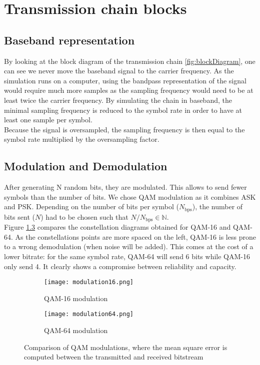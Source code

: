 \setcounter{secnumdepth}{-1}

\chapter{Transmission chain blocks}

\section{Baseband representation}

By looking at the block diagram of the transmission chain \ref{fig:blockDiagram}, one can see we never move the baseband signal to the carrier frequency. As the simulation runs on a computer, using the bandpass representation of the signal would require much more samples as the sampling frequency would need to be at least twice the carrier frequency. By simulating the chain in baseband, the minimal sampling frequency is reduced to the symbol rate in order to have at least one sample per symbol. \\
Because the signal is oversampled, the sampling frequency is then equal to the symbol rate multiplied by the oversampling factor. \\

\section{Modulation and Demodulation}

After generating N random bits, they are modulated. This allows to send fewer symbols than the number of bits. We chose QAM modulation as it combines ASK and PSK. Depending on the number of bits per symbol ($N_{\text{bps}}$), the number of bits sent ($N$) had to be chosen such that  $N / N_{\text{bps}} \in \mathbb{N}$. \\
Figure \ref{fig:QAMComparison} compares the constellation diagrams obtained for QAM-16 and QAM-64. As the constellations points are more spaced on the left, QAM-16 is less prone to a wrong demodulation (when noise will be added). This comes at the cost of a lower bitrate: for the same symbol rate, QAM-64 will send 6 bits while QAM-16 only send 4. It clearly shows a compromise between reliability and capacity. \\

\begin{figure}[H]
    \centering
    \begin{subfigure}[b]{0.45\linewidth}
        \centering
        \texttt{[image: modulation16.png]}
        \caption{QAM-16 modulation}
        \label{fig:QAM16}
    \end{subfigure}
    \hfill
    \begin{subfigure}[b]{0.45\linewidth}
        \centering
        \texttt{[image: modulation64.png]}
        \caption{QAM-64 modulation}
        \label{fig:QAM64}
    \end{subfigure}
    \caption{Comparison of QAM modulations, where the mean square error is computed between the transmitted and received bitstream}
    \label{fig:QAMComparison}
\end{figure}

